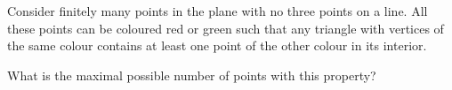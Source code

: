 Consider finitely many points in the plane with no three points on a line. All these points can be coloured red or green such that any triangle with vertices of the same colour contains at least one point of the other colour in its interior.

What is the maximal possible number of points with this property?